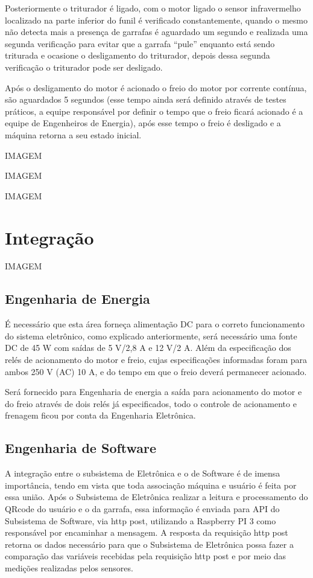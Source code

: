 Posteriormente o triturador é ligado, com o motor ligado o sensor infravermelho localizado na parte inferior do funil é verificado constantemente, quando o mesmo não detecta mais a presença de garrafas é aguardado um segundo e realizada uma segunda verificação para evitar que a garrafa “pule” enquanto está sendo triturada e ocasione o desligamento do triturador, depois dessa segunda verificação o triturador pode ser desligado.

Após o desligamento do motor é acionado o freio do motor por corrente contínua, são aguardados 5 segundos (esse tempo ainda será definido através de testes práticos, a equipe responsável por definir o tempo que o freio ficará acionado é a equipe de Engenheiros de Energia), após esse tempo o freio é desligado e a máquina retorna a seu estado inicial.

IMAGEM

IMAGEM

IMAGEM

\section{Integração}
IMAGEM

\subsection{Engenharia de Energia}
É necessário que esta área forneça alimentação DC para o correto funcionamento do sistema eletrônico, como explicado anteriormente, será necessário uma fonte DC de 45 W com saídas de 5 V/2,8 A e 12 V/2 A. Além da especificação dos relés de acionamento do motor e freio, cujas especificações informadas foram para ambos 250 V (AC) 10 A, e do tempo em que o freio deverá permanecer acionado.

Será fornecido para Engenharia de energia a saída para acionamento do motor e do freio através de dois relés já especificados, todo o controle de acionamento e frenagem ficou por conta da Engenharia Eletrônica. 

\subsection{Engenharia de Software}
A integração entre o subsistema de Eletrônica e o de Software é de imensa importância, tendo em vista que toda associação máquina e usuário é feita por essa união. Após o Subsistema de Eletrônica realizar a leitura e processamento do QRcode do usuário e o da garrafa, essa informação é enviada para API do Subsistema de Software, via http post, utilizando a Raspberry PI 3 como responsável por encaminhar a mensagem. A resposta da requisição http post retorna os dados necessário para que o Subsistema de Eletrônica possa fazer a comparação das variáveis recebidas pela requisição http post e por meio das medições realizadas pelos sensores. 

